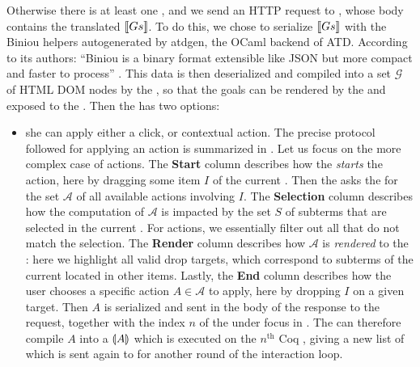 Otherwise there is at least one , and we send an  HTTP
request to , whose body contains the translated  $\llbracket Gs \rrbracket$. To
do this, we chose to serialize $\llbracket Gs \rrbracket$ with the Biniou helpers
autogenerated by atdgen, the OCaml backend of ATD. According to its authors:
``Biniou is a binary format extensible like JSON but more compact and faster to
process'' . This data is then deserialized and compiled into a
set $\mathcal{G}$ of HTML DOM nodes by the , so that the goals
can be rendered by the  and exposed to the .
Then the  has two options:
\begin{itemize}
  \item she can apply either a click,  or contextual action. The precise protocol followed for applying an action is
  summarized in . Let us focus on the more complex case
  of  actions. The \textbf{Start} column describes how the 
  \emph{starts} the action, here by dragging some item $I$ of the current
  . Then the  asks the  for the set
  $\mathcal{A}$ of all available  actions involving $I$. The
  \textbf{Selection} column describes how the computation of $\mathcal{A}$ is
  impacted by the set $S$ of subterms that are selected in the current .
  For  actions, we essentially filter out all  that do not match the
  selection. The \textbf{Render} column describes how $\mathcal{A}$ is
  \emph{rendered} to the : here we highlight all valid drop
  targets, which correspond to subterms of the current  located in other
  items. Lastly, the \textbf{End} column describes how
  the user chooses a specific action $A \in \mathcal{A}$ to apply, here by
  dropping $I$ on a given target. Then $A$ is serialized and sent in the body of
  the response to the  request, together with the index $n$ of
  the  under focus in . The  can therefore compile
  $A$ into a  $\llparenthesis A \rrparenthesis$ which is executed on the $n^{\text{th}}$ Coq
  , giving a new list of  which is sent again to  for
  another round of the interaction loop.


\end{itemize}

